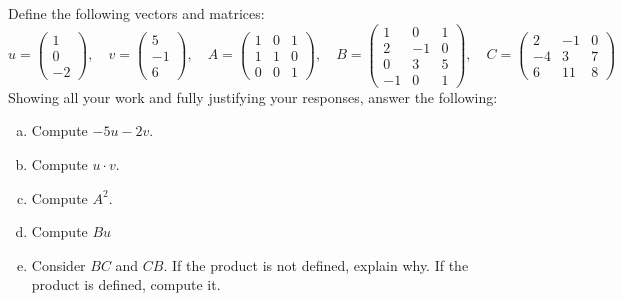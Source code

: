 \documentclass[12pt,letterpaper]{exam}
\begin{document}
\examtitle
{} 
\scores
\bottomline
\newpage

\begin{questions}

\newpage
\question[10] Define the following vectors and matrices:
	\[
	u= \begin{pmatrix} 1 \\ 0 \\ -2 \end{pmatrix}, \quad
	v= \begin{pmatrix} 5 \\ -1 \\ 6 \end{pmatrix}, \quad
	A= \begin{pmatrix} 1 & 0 & 1 \\ 1 & 1 & 0 \\ 0 & 0 & 1 \end{pmatrix}, \quad
	B= \begin{pmatrix} 1 & 0 & 1 \\ 2 & -1 & 0 \\ 0 & 3 & 5 \\ -1 & 0 & 1 \end{pmatrix}, \quad
	C= \begin{pmatrix} 2 & -1 & 0 \\ -4 & 3 & 7 \\ 6 & 11 & 8 \end{pmatrix}
	\]
Showing all your work and fully justifying your responses, answer the following:
	\begin{enumerate}[(a)]
	\item Compute $-5u - 2v$.
	\item Compute $u \cdot v$.
	\item Compute $A^2$.
	\item Compute $Bu$
	\item Consider $BC$ and $CB$. If the product is not defined, explain why. If the product is defined, compute it. 
	\end{enumerate}




\end{questions}
\end{document}
